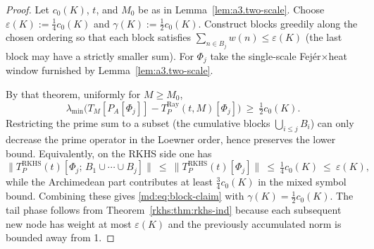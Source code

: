 \begin{proof}
Let $c_0(K)$, $t$, and $M_0$ be as in Lemma~\ref{lem:a3.two-scale}. Choose $\varepsilon(K):=\tfrac14 c_0(K)$ and $\gamma(K):=\tfrac12 c_0(K)$. Construct blocks greedily along the chosen ordering so that each block satisfies $\sum_{n\in B_j} w(n)\le\varepsilon(K)$ (the last block may have a strictly smaller sum). For $\Phi_j$ take the single-scale Fej\'er$\times$heat window furnished by Lemma~\ref{lem:a3.two-scale}.

By that theorem, uniformly for $M\ge M_0$,
\begin{equation}\label{eq:MD_2_3_base_interval-lambda-min}
 \lambda_{\min}\!\bigl(T_M[P_A[\Phi_j]]-T_P^{\mathrm{Ray}}(t,M)[\Phi_j]\bigr)\ \ge\ \tfrac12 c_0(K).
\end{equation}
Restricting the prime sum to a subset (the cumulative blocks $\bigcup_{i\le j} B_i$) can only decrease the prime operator in the Loewner order, hence preserves the lower bound. Equivalently, on the RKHS side one has
\begin{equation}\label{eq:MD_2_3_base_interval-formula-4}
 \|T_P^{\mathrm{RKHS}}(t)[\Phi_j;\, B_1\cup\cdots\cup B_j]\|\ \le\ \|T_P^{\mathrm{RKHS}}(t)[\Phi_j]\|\ \le\ \tfrac14 c_0(K)\ \le\ \varepsilon(K),
\end{equation}
while the Archimedean part contributes at least $\tfrac34 c_0(K)$ in the mixed symbol bound. Combining these gives \eqref{md:eq:block-claim} with $\gamma(K)=\tfrac12 c_0(K)$. The tail phase follows from Theorem~\ref{rkhs:thm:rkhs-ind} because each subsequent new node has weight at most $\varepsilon(K)$ and the previously accumulated norm is bounded away from 1.
\end{proof}


